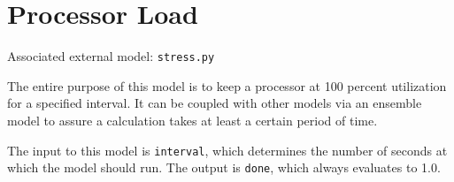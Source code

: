 \section{Processor Load}
Associated external model: \texttt{stress.py}

The entire purpose of this model is to keep a processor at 100 percent utilization for a specified interval.
It can be coupled with other models via an ensemble model to assure a calculation takes at least a certain
period of time.

The input to this model is \texttt{interval}, which determines the number of seconds at which the model should
run. The output is \texttt{done}, which always evaluates to 1.0.

